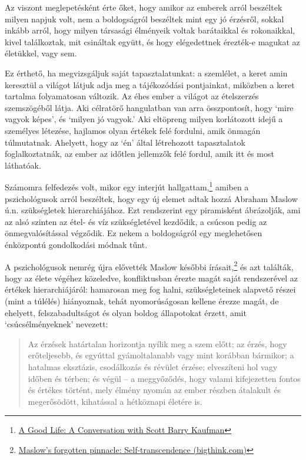 
\enlargethispage*{\baselineskip}

Az viszont meglepetésként érte őket, hogy amikor az emberek arról
beszéltek milyen napjuk volt, nem a boldogságról beszéltek mint egy jó
érzésről, sokkal inkább arról, hogy milyen társasági élményeik voltak
barátaikkal és rokonaikkal, kivel találkoztak, mit csináltak együtt, és
hogy elégedettnek érezték-e magukat az életükkel, vagy sem.

Ez érthető, ha megvizsgáljuk saját tapasztalatunkat: a szemlélet, a
keret amin keresztül a világot látjuk adja meg a tájékozódási
pontjainkat, miközben a keret tartalma folyamatosan változik. Az éhes
ember a világot az ételszerzés szemszögéből látja. Aki célratörő
hangulatban van arra összpontosít, hogy `mire vagyok képes', és `milyen
jó vagyok.' Aki eltöpreng milyen korlátozott idejű a személyes létezése,
hajlamos olyan értékek felé fordulni, amik önmagán túlmutatnak.
Ahelyett, hogy az `én' által létrehozott tapasztalatok foglalkoztatnák,
az ember az időtlen jellemzők felé fordul, amik itt és most láthatóak.

Számomra felfedezés volt, mikor egy interjút hallgattam,\footnote{\href{https://www.samharris.org/podcasts/making-sense-episodes/209-a-good-life}{A
  Good Life: A Conversation with Scott Barry Kaufman}} amiben a
pszichológusok arról beszéltek, hogy egy új elemet adtak hozzá Abraham
Maslow ú.n. szükségletek hierarchiájához. Ezt rendszerint egy
piramisként ábrázolják, ami az alsó szinten az étel- és víz
szükségletével kezdődik, a csúcson pedig az önmegvalósítással végződik.
Ez nekem a boldogságról egy meglehetősen énközpontú gondolkodási módnak
tűnt.

\enlargethispage*{\baselineskip}

A pszichológusok nemrég újra elővették Maslow későbbi
írásait,\footnote{\href{https://bigthink.com/neuropsych/maslow-self-transcendence/}{Maslow's
  forgotten pinnacle: Self-transcendence (bigthink.com)}} és azt
találták, hogy az élete végéhez közeledve, konfliktusban érezte magát
saját rendszerével az értékek hierarchiájáról: hamarosan meg fog halni,
szükségleteinek alapvető részei (mint a túlélés) hiányoznak, tehát
nyomorúságosan kellene érezze magát, de ehelyett, felszabadultságot és
olyan boldog állapotokat érzett, amit `csúcsélményeknek' nevezett:

\begin{quote}
Az érzések határtalan horizontja nyílik meg a szem előtt; az érzés, hogy
erőteljesebb, és egyúttal gyámoltalanabb vagy mint korábban bármikor; a
hatalmas eksztázis, csodálkozás és révület érzése; elveszíteni hol vagy
időben és térben; és végül -- a meggyőződés, hogy valami kifejezetten
fontos és értékes történt, mely élmény nyomán az ember részben átalakult
és megerősödött, kihatással a hétköznapi életére is.
\end{quote}

